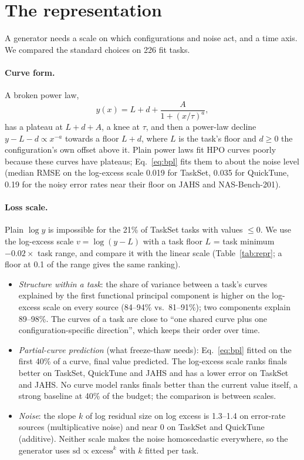 \documentclass[10pt]{article}
\begin{document}
\section{The representation}
\label{sec:representation}

A generator needs a scale on which configurations and noise act, and a time axis. We compared the standard choices
on 226 fit tasks.

\paragraph{Curve form.} A broken power law,
\begin{equation}
  y(x) = L + d + \frac{A}{1 + (x/\tau)^{a}},
  \label{eq:bpl}
\end{equation}
has a plateau at $L + d + A$, a knee at $\tau$, and then a power-law decline $y - L - d \propto x^{-a}$ towards a
floor $L + d$, where $L$ is the task's floor and $d \ge 0$ the configuration's own offset above it. Plain power laws
fit HPO curves poorly because these curves have plateaus; Eq.~\eqref{eq:bpl} fits them to about the noise level
(median RMSE on the log-excess scale 0.019 for TaskSet, 0.035 for QuickTune, 0.19 for the noisy error rates near
their floor on JAHS and NAS-Bench-201).

\paragraph{Loss scale.} Plain $\log y$ is impossible for the 21\% of TaskSet tasks with values $\le 0$. We use the
log-excess scale $v = \log(y - L)$ with a task floor $L$ = task minimum $- 0.02 \times$ task range, and compare it
with the linear scale (Table~\ref{tab:repr}; a floor at 0.1 of the range gives the same ranking).
\begin{itemize}
  \item \emph{Structure within a task}: the share of variance between a task's curves explained by the first
    functional principal component is higher on the log-excess scale on every source (84--94\% vs.\ 81--91\%);
    two components explain 89--98\%. The curves of a task are close to ``one shared curve plus one
    configuration-specific direction'', which keeps their order over time.
  \item \emph{Partial-curve prediction} (what freeze-thaw needs): Eq.~\eqref{eq:bpl} fitted on the first 40\% of a
    curve, final value predicted. The log-excess scale ranks finals better on TaskSet, QuickTune and JAHS and has a
    lower error on TaskSet and JAHS. No curve model ranks finals better than the current value itself, a strong
    baseline at 40\% of the budget; the comparison is between scales.
  \item \emph{Noise}: the slope $k$ of log residual size on log excess is 1.3--1.4 on error-rate sources
    (multiplicative noise) and near 0 on TaskSet and QuickTune (additive). Neither scale makes the noise
    homoscedastic everywhere, so the generator uses $\text{sd} \propto \text{excess}^{k}$ with $k$ fitted per task.
\end{itemize}
\end{document}
